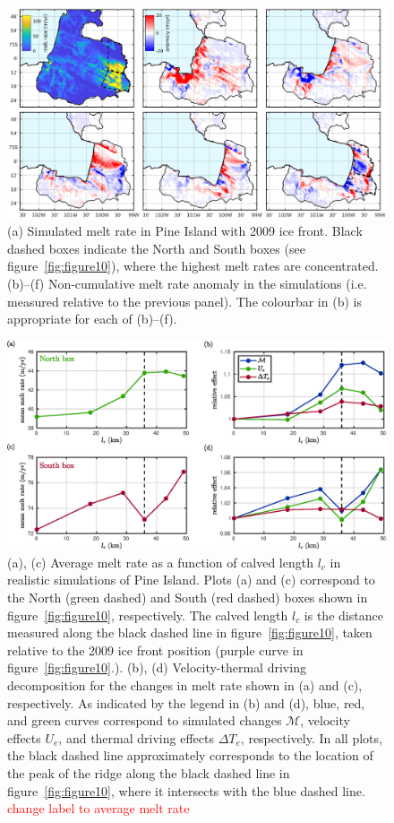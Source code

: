 \documentclass[draft]{agujournal2019}
\newcommand{\red}[1]{\textcolor{red}{#1}}
\begin{document}
\begin{figure}
    \centering
    \includegraphics[width = \textwidth]{../make_figures/plots/figure11.eps}
    \caption{(a) Simulated melt rate in Pine Island with 2009 ice front. Black dashed boxes indicate the North and South boxes (see figure~\ref{fig:figure10}), where the highest melt rates are concentrated. (b)--(f) Non-cumulative melt rate anomaly in the simulations (i.e. measured relative to the previous panel). The colourbar in (b) is appropriate for each of (b)--(f). }
    \label{fig:figure11}
\end{figure}

\begin{figure}
    \centering
    \includegraphics[width = \textwidth]{../make_figures/plots/figure12.eps}
    \caption{(a), (c) Average melt rate as a function of calved length $l_c$ in realistic simulations of Pine Island. Plots (a) and (c) correspond to the North (green dashed) and South (red dashed) boxes shown in figure~\ref{fig:figure10}, respectively. The calved length $l_c$ is the distance measured along the black dashed line in figure~\ref{fig:figure10}, taken relative to the 2009 ice front position (purple curve in figure~\ref{fig:figure10}.). (b), (d) Velocity-thermal driving decomposition for the changes in melt rate shown in (a) and (c), respectively. As indicated by the legend in (b) and (d), blue, red, and green curves correspond to simulated changes $\mathcal{M}$, velocity effects $U_e$, and thermal driving effects $\Delta T_e$, respectively. In all plots, the black dashed line approximately corresponds to the location of the peak of the ridge along the black dashed line in figure~\ref{fig:figure10}, where it intersects with the blue dashed line.   \red{change label to average melt rate} }
    \label{fig:figure12}
\end{figure}
\end{document}
